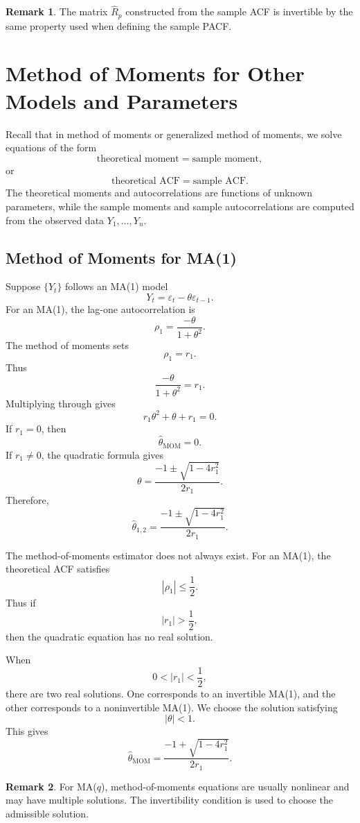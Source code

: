 \documentclass[12pt,oneside]{book}
\numberwithin{equation}{section}
\theoremstyle{definition}
\newtheorem{remark}{Remark}[section]
\theoremstyle{plain}
\theoremstyle{remark}
\begin{document}
\begin{remark}
The matrix $\widehat{R}_p$ constructed from the sample ACF is invertible by the same property used when defining the sample PACF.
\end{remark}

\section{Method of Moments for Other Models and Parameters}

Recall that in method of moments or generalized method of moments, we solve equations of the form
\[
\text{theoretical moment}=\text{sample moment},
\]
or
\[
\text{theoretical ACF}=\text{sample ACF}.
\]
The theoretical moments and autocorrelations are functions of unknown parameters, while the sample moments and sample autocorrelations are computed from the observed data $Y_1,\ldots,Y_n$.

\subsection*{Method of Moments for MA(1)}

Suppose $\{Y_t\}$ follows an MA(1) model
\[
Y_t=\varepsilon_t-\theta\varepsilon_{t-1}.
\]
For an MA(1), the lag-one autocorrelation is
\[
\rho_1=\frac{-\theta}{1+\theta^2}.
\]
The method of moments sets
\[
\rho_1=r_1.
\]
Thus
\[
\frac{-\theta}{1+\theta^2}=r_1.
\]
Multiplying through gives
\[
r_1\theta^2+\theta+r_1=0.
\]
If $r_1=0$, then
\[
\widehat{\theta}_{\mathrm{MOM}}=0.
\]
If $r_1\neq 0$, the quadratic formula gives
\[
\theta
=
\frac{-1\pm\sqrt{1-4r_1^2}}{2r_1}.
\]
Therefore,
\[
\widehat{\theta}_{1,2}
=
\frac{-1\pm\sqrt{1-4r_1^2}}{2r_1}.
\]

The method-of-moments estimator does not always exist. For an MA(1), the theoretical ACF satisfies
\[
|\rho_1|\leq \frac{1}{2}.
\]
Thus if
\[
|r_1|>\frac{1}{2},
\]
then the quadratic equation has no real solution.

When
\[
0<|r_1|<\frac{1}{2},
\]
there are two real solutions. One corresponds to an invertible MA(1), and the other corresponds to a noninvertible MA(1). We choose the solution satisfying
\[
|\theta|<1.
\]
This gives
\[
\widehat{\theta}_{\mathrm{MOM}}
=
\frac{-1+\sqrt{1-4r_1^2}}{2r_1}.
\]

\begin{remark}
For MA($q$), method-of-moments equations are usually nonlinear and may have multiple solutions. The invertibility condition is used to choose the admissible solution.
\end{remark}
\end{document}
